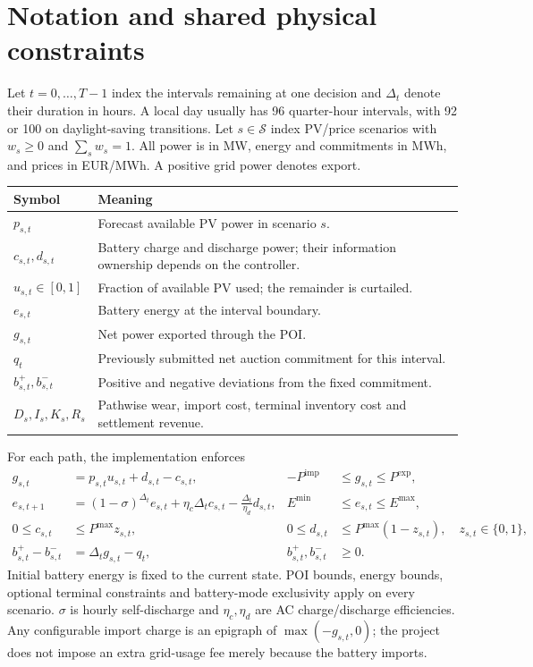 \documentclass[11pt,a4paper]{article}
\begin{document}
\section{Notation and shared physical constraints}
Let $t=0,\ldots,T-1$ index the intervals remaining at one decision and
$\Delta_t$ denote their duration in hours. A local day usually has 96
quarter-hour intervals, with 92 or 100 on daylight-saving transitions. Let
$s\in\mathcal S$ index PV/price scenarios with $w_s\ge0$ and
$\sum_s w_s=1$. All power is in MW, energy and commitments in MWh, and prices
in EUR/MWh. A positive grid power denotes export.

\begin{longtable}{>{\raggedright\arraybackslash}p{}>{\raggedright\arraybackslash}p{}}
\toprule Symbol & Meaning \\
\midrule\endhead
$p_{s,t}$ & Forecast available PV power in scenario $s$. \\
$c_{s,t},d_{s,t}$ & Battery charge and discharge power; their information ownership depends on the controller. \\
$u_{s,t}\in[0,1]$ & Fraction of available PV used; the remainder is curtailed. \\
$e_{s,t}$ & Battery energy at the interval boundary. \\
$g_{s,t}$ & Net power exported through the POI. \\
$q_t$ & Previously submitted net auction commitment for this interval. \\
$b^+_{s,t},b^-_{s,t}$ & Positive and negative deviations from the fixed commitment. \\
$D_s,I_s,K_s,R_s$ & Pathwise wear, import cost, terminal inventory cost and settlement revenue. \\
\bottomrule
\end{longtable}

For each path, the implementation enforces
\begin{align}
 g_{s,t} &= p_{s,t}u_{s,t}+d_{s,t}-c_{s,t},
 &-P^{\mathrm{imp}} &\le g_{s,t}\le P^{\mathrm{exp}},\\
 e_{s,t+1} &= (1-\sigma)^{\Delta_t}e_{s,t}
       +\eta_c\Delta_t c_{s,t}-\frac{\Delta_t}{\eta_d}d_{s,t},
 &E^{\min}&\le e_{s,t}\le E^{\max},\\
 0\le c_{s,t}&\le P^{\max}z_{s,t},
 &0\le d_{s,t}&\le P^{\max}(1-z_{s,t}),\quad z_{s,t}\in\{0,1\},\\
 b^+_{s,t}-b^-_{s,t}&=\Delta_t g_{s,t}-q_t,
 &b^+_{s,t},b^-_{s,t}&\ge0.
\end{align}
Initial battery energy is fixed to the current state. POI bounds, energy
bounds, optional terminal constraints and battery-mode exclusivity apply on
every scenario. $\sigma$ is hourly self-discharge and $\eta_c,\eta_d$ are AC
charge/discharge efficiencies. Any configurable import charge is an epigraph
of $\max(-g_{s,t},0)$; the project does not impose an extra grid-usage fee
merely because the battery imports.
\end{document}

